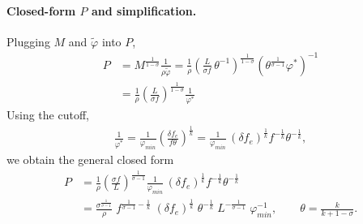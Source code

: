 \begin{solution}
    \paragraph{Closed-form $P$ and simplification.} Plugging $M$ and $\tilde{\varphi}$ into $P$,
    \begin{align*}
        P &= M^{\frac{1}{1-\sigma}} \frac{1}{\rho \tilde{\varphi}}
        = \frac{1}{\rho}\left(\frac{L}{\sigma f}\,\theta^{-1}\right)^{\frac{1}{1-\sigma}}
           \left(\theta^{\frac{1}{\sigma-1}}\varphi^*\right)^{-1} \\
          &= \frac{1}{\rho}\left(\frac{L}{\sigma f}\right)^{\frac{1}{1-\sigma}}\frac{1}{\varphi^*}
    \end{align*}
    Using the cutoff,
    \begin{align*}
        \frac{1}{\varphi^*} = \frac{1}{\varphi_{min}}\left(\frac{\delta f_e}{f\theta}\right)^{\frac{1}{k}}
        = \frac{1}{\varphi_{min}}\,(\delta f_e)^{\frac{1}{k}} f^{-\frac{1}{k}} \theta^{-\frac{1}{k}},
    \end{align*}
    we obtain the general closed form
    \begin{align*}
        P &= \frac{1}{\rho}\left(\frac{\sigma f}{L}\right)^{\frac{1}{\sigma-1}}
             \frac{1}{\varphi_{min}}\,
             (\delta f_e)^{\frac{1}{k}} f^{-\frac{1}{k}} \theta^{-\frac{1}{k}} \\[2pt]
          &= \frac{\sigma^{\frac{1}{\sigma-1}}}{\rho}\;
             f^{\frac{1}{\sigma-1}-\frac{1}{k}}\;
             (\delta f_e)^{\frac{1}{k}}\;
             \theta^{-\frac{1}{k}}\;
             L^{-\frac{1}{\sigma-1}}\;
             \varphi_{min}^{-1},
             \qquad \theta=\frac{k}{k+1-\sigma}.
    \end{align*}
\end{solution}
